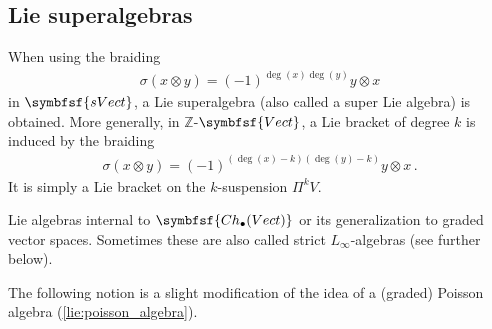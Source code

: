 \subsection{Lie superalgebras}

    \begin{example}\label{hda:lie_superalgebra}
        When using the braiding
        \begin{gather}
            \sigma(x\otimes y) = (-1)^{\deg(x)\deg(y)}y\otimes x
        \end{gather}
        in $\symbfsf{sVect}$, a Lie superalgebra (also called a super Lie algebra) is obtained. More generally, in $\mathbb{Z}$-$\symbfsf{Vect}$, a Lie bracket of degree $k$ is induced by the braiding
        \begin{gather}
            \sigma(x\otimes y) = (-1)^{(\deg(x)-k)(\deg(y)-k)}y\otimes x\,.
        \end{gather}
        It is simply a Lie bracket on the $k$-suspension $\Pi^kV$.
    \end{example}
    \begin{example}
        Lie algebras internal to $\symbfsf{Ch_\bullet(Vect)}$ or its generalization to graded vector spaces. Sometimes these are also called strict $L_\infty$-algebras (see further below).
    \end{example}

    The following notion is a slight modification of the idea of a (graded) Poisson algebra (\cref{lie:poisson_algebra}).

